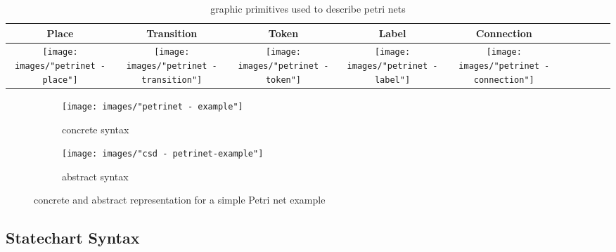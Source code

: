 \begin{table}[ht]
  \centering
\begin{tabular}[width=.1\linewidth]{| Sc | Sc | Sc | Sc | Sc |}
  \hline
  Place & Transition & Token & Label & Connection 
  \\
  \hline
  \texttt{[image: images/"petrinet - place"]} 
  & 
  \texttt{[image: images/"petrinet - transition"]} 
  & 
  \texttt{[image: images/"petrinet - token"]}
  & 
  \texttt{[image: images/"petrinet - label"]}
  & 
  \texttt{[image: images/"petrinet - connection"]} 
  \\
  \hline
\end{tabular}
\caption{graphic primitives used to describe petri nets}
\label{tab:petri-primitives}
\end{table}

\begin{figure}[ht!]
  \centering
  \begin{subfigure}[t]{.4\textwidth}
    \centering
    \texttt{[image: images/"petrinet - example"]}
    \caption{concrete syntax}
    \label{subfig:petriconcrete}    
  \end{subfigure}
  \begin{subfigure}[t]{.45\textwidth}
    \centering
    \texttt{[image: images/"csd - petrinet-example"]}
    \caption{abstract syntax}
    \label{subfig:petriabstract}    
  \end{subfigure}
  \caption{concrete and abstract representation for a simple Petri net example}
  \label{fig:petrinets_example}
\end{figure} 

\subsection{Statechart Syntax}
